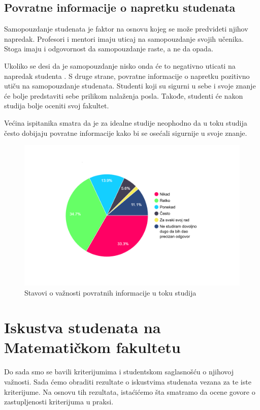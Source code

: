\documentclass[a4paper]{article}
\begin{document}
{\subsection{Povratne informacije o napretku studenata}
\label{subsec:povrane_informacije}

Samopouzdanje studenata je faktor na osnovu kojeg se može predvideti njihov napredak\cite{correlation}.
Profesori i mentori imaju uticaj na samopouzdanje svojih učenika. Stoga imaju i odgovornost da samopouzdanje raste, a ne da opada.

Ukoliko se desi da je samopouzdanje nisko onda će to negativno uticati na napredak studenta \cite{confidence}. S druge strane, povratne informacije o napretku pozitivno utiču na samopouzdanje studenata. Studenti koji su sigurni u sebe i svoje znanje će bolje predstaviti sebe prilikom nalaženja posla. Takođe, studenti će nakon studija bolje oceniti svoj fakultet. 

Većina ispitanika smatra da je za idealne studije neophodno da u toku studija često dobijaju povratne informacije kako bi se osećali sigurnije u svoje znanje. 
\begin{figure}[h!]
\begin{center}
    \includegraphics[width=0.7\linewidth]{Slike/PieChartPovratneInformacije.png}
    \caption{Stavovi o važnosti povratnih informacije u toku studija}
    \label{fig:povratne_informacije}
\end{center}
\end{figure}

\section{Iskustva studenata na Matematičkom fakultetu}
\label{sec:iskustva}

Do sada smo se bavili kriterijumima i studentskom saglasnošću o njihovoj važnosti. Sada ćemo obraditi rezultate o iskustvima studenata vezana za te iste kriterijume. Na osnovu tih rezultata, istaćićemo šta smatramo da ocene govore o zastupljenosti kriterijuma u praksi.  

}
\end{document}
